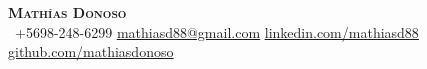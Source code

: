 \begin{center}
    \textbf{\Huge \scshape Mathías Donoso} \\ \vspace{1pt}
     \ \small +5698-248-6299 \quad
    \href{mailto:mathiasd88@gmail.com}{ \underline{mathiasd88@gmail.com}} \quad
    \href{https://www.linkedin.com/in/mathiasd88}{ \underline{linkedin.com/mathiasd88}} \quad
    \href{https://github.com/mathiasdonoso}{ \underline{github.com/mathiasdonoso}}
\end{center}
